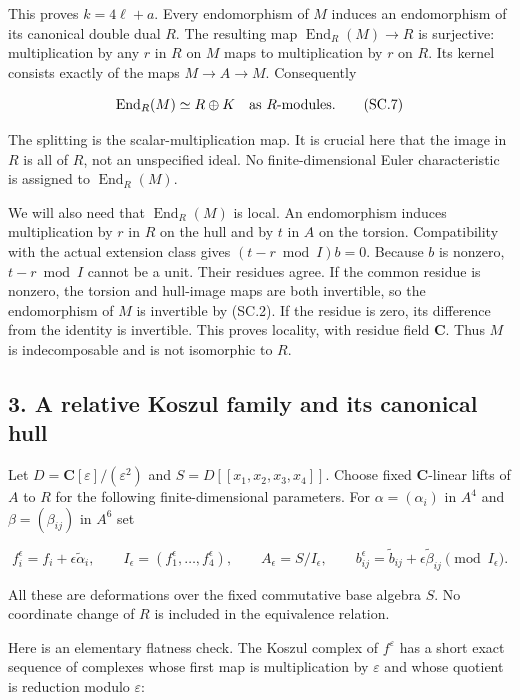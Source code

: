 This proves \(k=4\ell+a\). Every endomorphism of \(M\) induces an endomorphism
of its canonical double dual \(R\). The resulting map \(\operatorname{End}_R(M)\to R\) is
surjective: multiplication by any \(r\) in \(R\) on \(M\) maps to multiplication
by \(r\) on \(R\). Its kernel consists exactly of the maps \(M\to A\to M\). Consequently

\[
 \operatorname{End}_R(M)\simeq R\oplus K
       \quad\hbox{as }R\hbox{-modules}.
 \tag{SC.7}
\]

The splitting is the scalar-multiplication map. It is crucial here
that the image in \(R\) is all of \(R\), not an unspecified ideal.
No finite-dimensional Euler characteristic is assigned to \(\operatorname{End}_R(M)\).

We will also need that \(\operatorname{End}_R(M)\) is local. An endomorphism induces
multiplication by \(r\) in \(R\) on the hull and by \(t\) in \(A\) on the torsion.
Compatibility with the actual extension class gives \((t-r\bmod I)b=0\).
Because \(b\) is nonzero, \(t-r\bmod I\) cannot be a unit. Their residues agree.
If the common residue is nonzero, the torsion and hull-image maps
are both invertible, so the endomorphism of \(M\) is invertible by (SC.2).
If the residue is zero, its difference from the identity is invertible.
This proves locality, with residue field \(\mathbf C\). Thus \(M\) is indecomposable
and is not isomorphic to \(R\).

\subsection{3. A relative Koszul family and its canonical hull}\label{SF-E847:s3}

Let \(D=\mathbf C[\varepsilon]/(\varepsilon^2)\) and \(S=D[[x_1,x_2,x_3,x_4]]\). Choose fixed
\(\mathbf C\)-linear lifts of \(A\) to \(R\) for the following finite-dimensional
parameters. For \(\alpha=(\alpha_i)\) in \(A^4\) and \(\beta=(\beta_{ij})\) in \(A^6\) set

\[
 f_i^{\epsilon}=f_i+\epsilon\widetilde\alpha_i,\qquad
 I_\epsilon=(f_1^\epsilon,\ldots,f_4^\epsilon),\qquad
 A_\epsilon=S/I_\epsilon,
 \qquad
 b^\epsilon_{ij}=\widetilde b_{ij}
                 +\epsilon\widetilde\beta_{ij}\pmod{I_\epsilon}.
 \tag{SC.8}
\]

All these are deformations over the fixed commutative base algebra \(S\).
No coordinate change of \(R\) is included in the equivalence relation.

Here is an elementary flatness check. The Koszul complex of \(f^\varepsilon\)
has a short exact sequence of complexes whose first map is multiplication
by \(\varepsilon\) and whose quotient is reduction modulo \(\varepsilon\):

